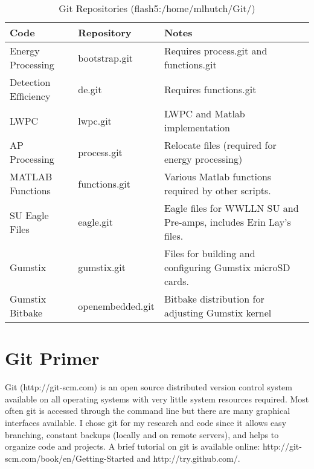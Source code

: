 \begin{table}[h!]
\caption{Git Repositories (flash5:/home/mlhutch/Git/)}
\begin{center}
\begin{tabular}{|p{1.5in}|p{1.25in}|p{3in}|}

\hline
{\bf Code} &	{\bf Repository} &	{\bf Notes}\\

\hline
\rule{0pt}{3ex}
Energy Processing	&bootstrap.git	&	Requires process.git and functions.git \\ 

\hline
\rule{0pt}{3ex}
Detection Efficiency	&de.git	&	Requires functions.git\\ 

\hline
\rule{0pt}{3ex}
LWPC	&lwpc.git	&	LWPC and Matlab implementation\\ 

\hline
\rule{0pt}{3ex}
AP Processing	&process.git	&	Relocate files (required for energy processing)\\ 

\hline
\rule{0pt}{3ex}
MATLAB Functions	&functions.git	&	Various Matlab functions required by other scripts.\\ 

\hline
\rule{0pt}{3ex}
SU Eagle Files	&eagle.git	&	Eagle files for WWLLN SU and Pre-amps, includes Erin Lay's files.\\ 

\hline
\rule{0pt}{3ex}
Gumstix	&gumstix.git	&	Files for building and configuring Gumstix microSD cards.\\ 

\hline
\rule{0pt}{3ex}
Gumstix Bitbake	&openembedded.git	&	Bitbake distribution for adjusting Gumstix kernel\\ 

\hline
\end{tabular}
\end{center}
\label{code:repo}
\end{table}

\section{Git Primer}
\label{code:primer}

Git (http://git-scm.com) is an open source distributed version control system available on all operating systems with very little system resources required.
Most often git is accessed through the command line but there are many graphical interfaces available.
I chose git for my research and code since it allows easy branching, constant backups (locally and on remote servers), and helps to organize code and projects.
A brief tutorial on git is available online: http://git-scm.com/book/en/Getting-Started and http://try.github.com/.

